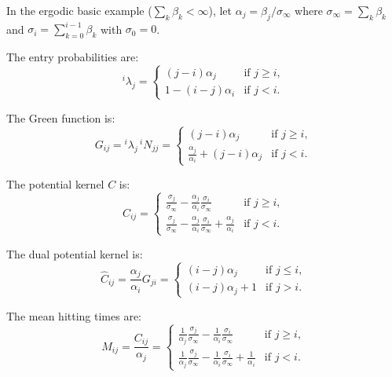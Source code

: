 In the ergodic basic example ($\sum_k \beta_k < \infty$), let $\alpha_j = \beta_j / \sigma_\infty$ where $\sigma_\infty = \sum_k \beta_k$ and $\sigma_i = \sum_{k=0}^{i-1} \beta_k$ with $\sigma_0 = 0$.

The entry probabilities are:
$$^i\lambda_j = \begin{cases} (j-i)\alpha_j & \text{if } j \geq i, \\ 1 - (i-j)\alpha_i & \text{if } j < i. \end{cases}$$

The Green function is:
$$G_{ij} = {^i\lambda_j} \, {^i N_{jj}} = \begin{cases} (j-i)\alpha_j & \text{if } j \geq i, \\ \frac{\alpha_j}{\alpha_i} + (j-i)\alpha_j & \text{if } j < i. \end{cases}$$

The potential kernel $C$ is:
$$C_{ij} = \begin{cases} \frac{\sigma_j}{\sigma_\infty} - \frac{\alpha_j}{\alpha_i} \frac{\sigma_i}{\sigma_\infty} & \text{if } j \geq i, \\ \frac{\sigma_j}{\sigma_\infty} - \frac{\alpha_j}{\alpha_i} \frac{\sigma_i}{\sigma_\infty} + \frac{\alpha_j}{\alpha_i} & \text{if } j < i. \end{cases}$$

The dual potential kernel is:
$$\hat{C}_{ij} = \frac{\alpha_j}{\alpha_i} G_{ji} = \begin{cases} (i-j)\alpha_j & \text{if } j \leq i, \\ (i-j)\alpha_j + 1 & \text{if } j > i. \end{cases}$$

The mean hitting times are:
$$M_{ij} = \frac{C_{ij}}{\alpha_j} = \begin{cases} \frac{1}{\alpha_j} \frac{\sigma_j}{\sigma_\infty} - \frac{1}{\alpha_i} \frac{\sigma_i}{\sigma_\infty} & \text{if } j \geq i, \\ \frac{1}{\alpha_j} \frac{\sigma_j}{\sigma_\infty} - \frac{1}{\alpha_i} \frac{\sigma_i}{\sigma_\infty} + \frac{1}{\alpha_i} & \text{if } j < i. \end{cases}$$
